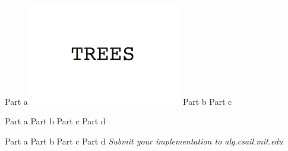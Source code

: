 \documentclass[12pt,twoside]{article}
\begin{document}

\begin{problems}

\problem  %

\begin{problemparts}
\problempart Part a  %
\includegraphics[width=0.5\textwidth]{img.jpg}
\problempart Part b  %
\problempart Part c  %
\end{problemparts}

\problem  %

\begin{problemparts}
\problempart Part a %
\problempart Part b %
\problempart Part c %
\problempart Part d %
\end{problemparts}

\problem  %

\begin{problemparts}
\problempart Part a %
\problempart Part b %
\problempart Part c %
\problempart Part d %
\problempart \emph{Submit your implementation to alg.csail.mit.edu}
\end{problemparts}

\end{problems}
\end{document}

